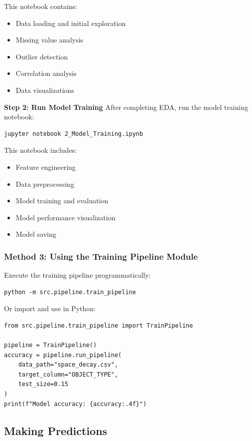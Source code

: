 \documentclass[12pt,a4paper]{article}
\begin{document}
This notebook contains:
\begin{itemize}
    \item Data loading and initial exploration
    \item Missing value analysis
    \item Outlier detection
    \item Correlation analysis
    \item Data visualizations
\end{itemize}

\textbf{Step 2: Run Model Training}
After completing EDA, run the model training notebook:
\begin{verbatim}
jupyter notebook 2_Model_Training.ipynb
\end{verbatim}

This notebook includes:
\begin{itemize}
    \item Feature engineering
    \item Data preprocessing
    \item Model training and evaluation
    \item Model performance visualization
    \item Model saving
\end{itemize}

\subsubsection{Method 3: Using the Training Pipeline Module}
Execute the training pipeline programmatically:
\begin{verbatim}
python -m src.pipeline.train_pipeline
\end{verbatim}

Or import and use in Python:
\begin{lstlisting}
from src.pipeline.train_pipeline import TrainPipeline

pipeline = TrainPipeline()
accuracy = pipeline.run_pipeline(
    data_path="space_decay.csv",
    target_column="OBJECT_TYPE",
    test_size=0.15
)
print(f"Model accuracy: {accuracy:.4f}")
\end{lstlisting}

\subsection{Making Predictions}
\end{document}
